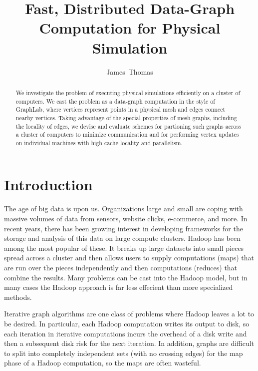 \documentclass[journal]{IEEEtran}
\begin{document}
\title{Fast, Distributed Data-Graph Computation for Physical Simulation}

\author{James~Thomas%
}



\maketitle

\begin{abstract}
We investigate the problem of executing physical simulations efficiently on a cluster of computers. We cast the problem as a data-graph computation in the style of GraphLab, where vertices represent points in a physical mesh and edges connect nearby vertices. Taking advantage of the special properties of mesh graphs, including the locality of edges, we devise and evaluate schemes for partioning such graphs across a cluster of computers to minimize communication and for performing vertex updates on individual machines with high cache locality and parallelism.
\end{abstract}


\IEEEpeerreviewmaketitle



\section{Introduction}
The age of big data is upon us. Organizations large and small are coping with massive volumes of data from sensors, website clicks, e-commerce, and more. In recent years, there has been growing
interest in developing frameworks for the storage and analysis of this data on large compute clusters. Hadoop \cite{hadoop} has been among the most popular of these. It breaks up large datasets into small pieces spread across a cluster and then allows users to supply computations (maps) that are run over the pieces independently and then computations (reduces) that combine the results. Many problems can be cast into the Hadoop model, but in many cases the Hadoop approach is far less effecient than more specialized methods.

Iterative graph algorithms are one class of problems where Hadoop leaves a lot to be desired. In particular, each Hadoop computation writes its output to disk, so each iteration in iterative computations incurs the overhead of a disk write and then a subsequent disk risk for the next iteration. In addition, graphs are difficult to split into completely independent sets (with no crossing edges) for the map phase of a Hadoop computation, so the maps are often wasteful.
\end{document}
